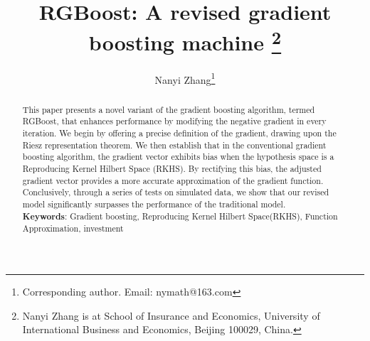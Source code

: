 \documentclass{article}
\begin{document}
\title{RGBoost: A revised gradient boosting machine
\footnote{Nanyi Zhang is at School of Insurance and Economics, University of International Business and Economics, Beijing 100029, China.
		} }
\author{ Nanyi Zhang\footnote{Corresponding author. Email: nymath@163.com}}
\date{}
\maketitle

\begin{abstract}

This paper presents a novel variant of the gradient boosting algorithm, termed RGBoost, that enhances performance by modifying the negative gradient in every iteration. We begin by offering a precise definition of the gradient, drawing upon the Riesz representation theorem. We then establish that in the conventional gradient boosting algorithm, the gradient vector exhibits bias when the hypothesis space is a Reproducing Kernel Hilbert Space (RKHS). By rectifying this bias, the adjusted gradient vector provides a more accurate approximation of the gradient function. Conclusively, through a series of tests on simulated data, we show that our revised model significantly surpasses the performance of the traditional model.
 \\
{\bf Keywords}: Gradient boosting, Reproducing Kernel Hilbert Space(RKHS), Function Approximation, investment
\end{abstract}









\end{document}
